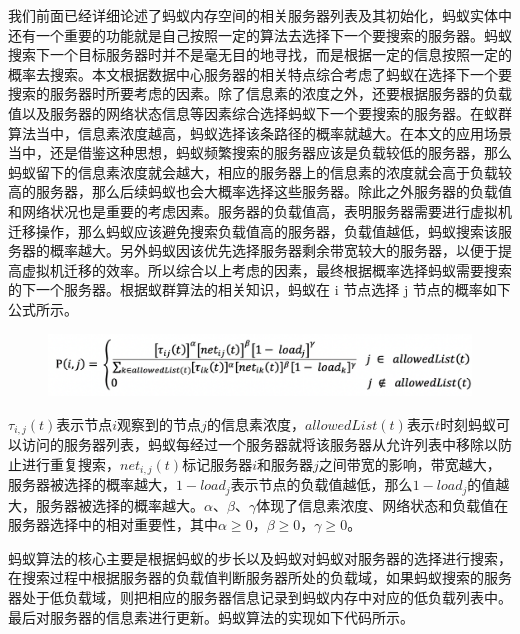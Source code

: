 我们前面已经详细论述了蚂蚁内存空间的相关服务器列表及其初始化，蚂蚁实体中还有一个重要的功能就是自己按照一定的算法去选择下一个要搜索的服务器。蚂蚁搜索下一个目标服务器时并不是毫无目的地寻找，而是根据一定的信息按照一定的概率去搜索。本文根据数据中心服务器的相关特点综合考虑了蚂蚁在选择下一个要搜索的服务器时所要考虑的因素。除了信息素的浓度之外，还要根据服务器的负载值以及服务器的网络状态信息等因素综合选择蚂蚁下一个要搜索的服务器。在蚁群算法当中，信息素浓度越高，蚂蚁选择该条路径的概率就越大。在本文的应用场景当中，还是借鉴这种思想，蚂蚁频繁搜索的服务器应该是负载较低的服务器，那么蚂蚁留下的信息素浓度就会越大，相应的服务器上的信息素的浓度就会高于负载较高的服务器，那么后续蚂蚁也会大概率选择这些服务器。除此之外服务器的负载值和网络状况也是重要的考虑因素。服务器的负载值高，表明服务器需要进行虚拟机迁移操作，那么蚂蚁应该避免搜索负载值高的服务器，负载值越低，蚂蚁搜索该服务器的概率越大。另外蚂蚁因该优先选择服务器剩余带宽较大的服务器，以便于提高虚拟机迁移的效率。所以综合以上考虑的因素，最终根据概率选择蚂蚁需要搜索的下一个服务器。根据蚁群算法的相关知识，蚂蚁在 i 节点选择 j 节点的概率如下公式所示。

\begin{figure}[htbp]
  \centering
  \includegraphics[width=0.8\linewidth]{./Figure/IMG_Chap3_5.png}
\end{figure}

$ τ_{i,j} (t) $表示节点$ i $观察到的节点$ j $的信息素浓度，$allowedList(t) $表示$ t $时刻蚂蚁可以访问的服务器列表，蚂蚁每经过一个服务器就将该服务器从允许列表中移除以防止进行重复搜索，$net_{i,j} (t) $标记服务器$ i $和服务器$ j $之间带宽的影响，带宽越大，服务器被选择的概率越大，$1 - load_j $表示节点的负载值越低，那么$ 1 - load_j $的值越大，服务器被选择的概率越大。$ α、β、γ $体现了信息素浓度、网络状态和负载值在服务器选择中的相对重要性，其中$ α ≥0，β ≥0，γ ≥0 $。

蚂蚁算法的核心主要是根据蚂蚁的步长以及蚂蚁对蚂蚁对服务器的选择进行搜索，在搜索过程中根据服务器的负载值判断服务器所处的负载域，如果蚂蚁搜索的服务器处于低负载域，则把相应的服务器信息记录到蚂蚁内存中对应的低负载列表中。最后对服务器的信息素进行更新。蚂蚁算法的实现如下代码所示。

